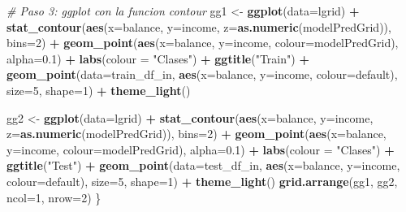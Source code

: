 \documentclass[]{book}
\newenvironment{Shaded}{\begin{snugshade}}{\end{snugshade}}
\newcommand{\CommentTok}[1]{\textcolor[rgb]{0.56,0.35,0.01}{\textit{#1}}}
\newcommand{\DataTypeTok}[1]{\textcolor[rgb]{0.13,0.29,0.53}{#1}}
\newcommand{\DecValTok}[1]{\textcolor[rgb]{0.00,0.00,0.81}{#1}}
\newcommand{\FloatTok}[1]{\textcolor[rgb]{0.00,0.00,0.81}{#1}}
\newcommand{\KeywordTok}[1]{\textcolor[rgb]{0.13,0.29,0.53}{\textbf{#1}}}
\newcommand{\NormalTok}[1]{#1}
\newcommand{\OperatorTok}[1]{\textcolor[rgb]{0.81,0.36,0.00}{\textbf{#1}}}
\newcommand{\StringTok}[1]{\textcolor[rgb]{0.31,0.60,0.02}{#1}}
\begin{document}
\begin{Shaded}
\begin{Highlighting}[]
  \CommentTok{# Paso 3: ggplot con la funcion contour}
\NormalTok{  gg1 <-}\StringTok{ }\KeywordTok{ggplot}\NormalTok{(}\DataTypeTok{data=}\NormalTok{lgrid) }\OperatorTok{+}
\StringTok{    }\KeywordTok{stat_contour}\NormalTok{(}\KeywordTok{aes}\NormalTok{(}\DataTypeTok{x=}\NormalTok{balance, }\DataTypeTok{y=}\NormalTok{income, }\DataTypeTok{z=}\KeywordTok{as.numeric}\NormalTok{(modelPredGrid)), }\DataTypeTok{bins=}\DecValTok{2}\NormalTok{) }\OperatorTok{+}
\StringTok{    }\KeywordTok{geom_point}\NormalTok{(}\KeywordTok{aes}\NormalTok{(}\DataTypeTok{x=}\NormalTok{balance, }\DataTypeTok{y=}\NormalTok{income, }\DataTypeTok{colour=}\NormalTok{modelPredGrid), }\DataTypeTok{alpha=}\FloatTok{0.1}\NormalTok{) }\OperatorTok{+}
\StringTok{    }\KeywordTok{labs}\NormalTok{(}\DataTypeTok{colour =} \StringTok{"Clases"}\NormalTok{) }\OperatorTok{+}\StringTok{ }\KeywordTok{ggtitle}\NormalTok{(}\StringTok{"Train"}\NormalTok{) }\OperatorTok{+}
\StringTok{    }\KeywordTok{geom_point}\NormalTok{(}\DataTypeTok{data=}\NormalTok{train_df_in,}
               \KeywordTok{aes}\NormalTok{(}\DataTypeTok{x=}\NormalTok{balance, }\DataTypeTok{y=}\NormalTok{income,}
                   \DataTypeTok{colour=}\NormalTok{default), }\DataTypeTok{size=}\DecValTok{5}\NormalTok{, }\DataTypeTok{shape=}\DecValTok{1}\NormalTok{) }\OperatorTok{+}
\StringTok{    }\KeywordTok{theme_light}\NormalTok{()}

\NormalTok{  gg2 <-}\StringTok{ }\KeywordTok{ggplot}\NormalTok{(}\DataTypeTok{data=}\NormalTok{lgrid) }\OperatorTok{+}
\StringTok{    }\KeywordTok{stat_contour}\NormalTok{(}\KeywordTok{aes}\NormalTok{(}\DataTypeTok{x=}\NormalTok{balance, }\DataTypeTok{y=}\NormalTok{income, }\DataTypeTok{z=}\KeywordTok{as.numeric}\NormalTok{(modelPredGrid)), }\DataTypeTok{bins=}\DecValTok{2}\NormalTok{) }\OperatorTok{+}
\StringTok{    }\KeywordTok{geom_point}\NormalTok{(}\KeywordTok{aes}\NormalTok{(}\DataTypeTok{x=}\NormalTok{balance, }\DataTypeTok{y=}\NormalTok{income, }\DataTypeTok{colour=}\NormalTok{modelPredGrid), }\DataTypeTok{alpha=}\FloatTok{0.1}\NormalTok{) }\OperatorTok{+}
\StringTok{    }\KeywordTok{labs}\NormalTok{(}\DataTypeTok{colour =} \StringTok{"Clases"}\NormalTok{) }\OperatorTok{+}\StringTok{ }\KeywordTok{ggtitle}\NormalTok{(}\StringTok{"Test"}\NormalTok{) }\OperatorTok{+}
\StringTok{    }\KeywordTok{geom_point}\NormalTok{(}\DataTypeTok{data=}\NormalTok{test_df_in,}
               \KeywordTok{aes}\NormalTok{(}\DataTypeTok{x=}\NormalTok{balance, }\DataTypeTok{y=}\NormalTok{income,}
                   \DataTypeTok{colour=}\NormalTok{default), }\DataTypeTok{size=}\DecValTok{5}\NormalTok{, }\DataTypeTok{shape=}\DecValTok{1}\NormalTok{) }\OperatorTok{+}
\StringTok{    }\KeywordTok{theme_light}\NormalTok{()}
  \KeywordTok{grid.arrange}\NormalTok{(gg1, gg2, }\DataTypeTok{ncol=}\DecValTok{1}\NormalTok{, }\DataTypeTok{nrow=}\DecValTok{2}\NormalTok{)}
\NormalTok{\}}
\end{Highlighting}
\end{Shaded}
\end{document}
